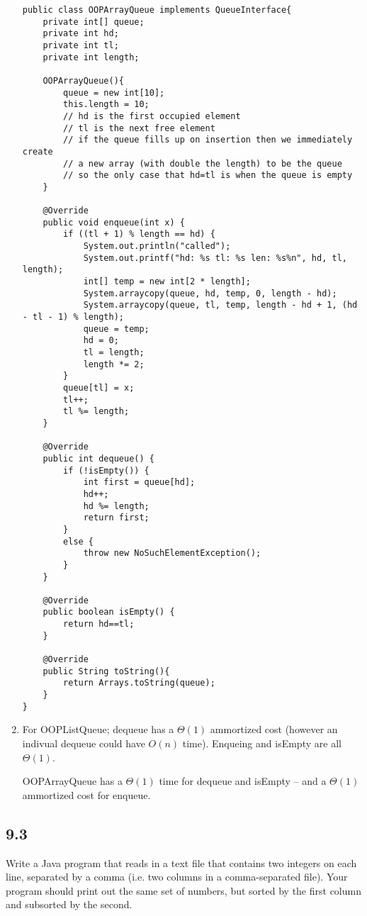 \documentclass[10pt,\jkfside,a4paper]{article}
\begin{document}
\begin{enumerate}
\begin{verbatim}
public class OOPArrayQueue implements QueueInterface{
    private int[] queue;
    private int hd;
    private int tl;
    private int length;

    OOPArrayQueue(){
        queue = new int[10];
        this.length = 10;
        // hd is the first occupied element
        // tl is the next free element
        // if the queue fills up on insertion then we immediately create
        // a new array (with double the length) to be the queue
        // so the only case that hd=tl is when the queue is empty
    }

    @Override
    public void enqueue(int x) {
        if ((tl + 1) % length == hd) {
            System.out.println("called");
            System.out.printf("hd: %s tl: %s len: %s%n", hd, tl, length);
            int[] temp = new int[2 * length];
            System.arraycopy(queue, hd, temp, 0, length - hd);
            System.arraycopy(queue, tl, temp, length - hd + 1, (hd - tl - 1) % length);
            queue = temp;
            hd = 0;
            tl = length;
            length *= 2;
        }
        queue[tl] = x;
        tl++;
        tl %= length;
    }

    @Override
    public int dequeue() {
        if (!isEmpty()) {
            int first = queue[hd];
            hd++;
            hd %= length;
            return first;
        }
        else {
            throw new NoSuchElementException();
        }
    }

    @Override
    public boolean isEmpty() {
        return hd==tl;
    }

    @Override
    public String toString(){
        return Arrays.toString(queue);
    }
}
\end{verbatim}

\item For OOPListQueue; dequeue has a $\Theta(1)$ ammortized cost (however an indivual dequeue could have $O(n)$ time). 
Enqueing and isEmpty are all $\Theta(1)$.

OOPArrayQueue has a $\Theta(1)$ time for dequeue and isEmpty -- and a $\Theta(1)$ ammortized cost for enqueue.

\end{enumerate}

\subsection*{9.3} Write a Java program that reads in a text file that contains two integers on each line, 
separated by a comma (i.e. two columns in a comma-separated file). Your program should print out the 
same set of numbers, but sorted by the first column and subsorted by the second.
\end{document}
